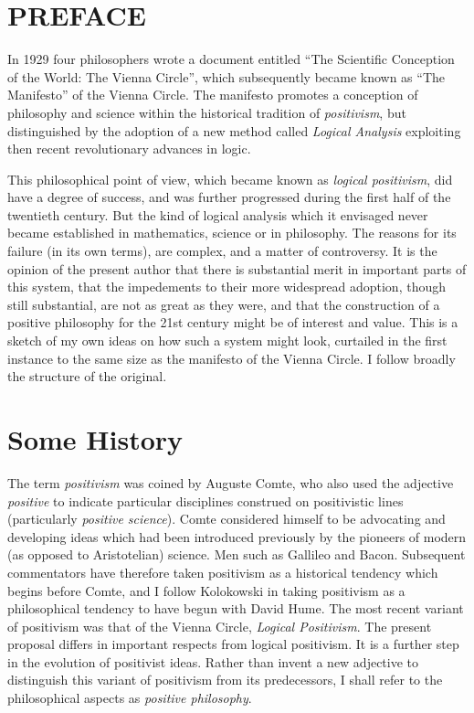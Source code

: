\section*{PREFACE}

In 1929 four philosophers wrote a document entitled ``The Scientific Conception of the World: The Vienna Circle'', which subsequently became known as ``The Manifesto'' of the Vienna Circle.
The manifesto promotes a conception of philosophy and science within the historical tradition of \emph{positivism}, but distinguished by the adoption of a new method called \emph{Logical Analysis} exploiting then recent revolutionary advances in logic.

This philosophical point of view, which became known as \emph{logical positivism}, did have a degree of success, and was further progressed during the first half of the twentieth century.
But the kind of logical analysis which it envisaged never became established in mathematics, science or in philosophy.
The reasons for its failure (in its own terms), are complex, and a matter of controversy.
It is the opinion of the present author that there is substantial merit in important parts of this system, that the impedements to their more widespread adoption, though still substantial, are not as great as they were, and that the construction of a positive philosophy for the 21st century might be of interest and value.
This is a sketch of my own ideas on how such a system might look, curtailed in the first instance to the same size as the manifesto of the Vienna Circle.
I follow broadly the structure of the original.

\section{Some History}

The term \emph{positivism} was coined by Auguste Comte, who also used the adjective \emph{positive} to indicate particular disciplines construed on positivistic lines (particularly \emph{positive science}).
Comte considered himself to be advocating and developing ideas which had been introduced previously by the pioneers of modern (as opposed to Aristotelian) science.
Men such as Gallileo and Bacon.
Subsequent commentators have therefore taken positivism as a historical tendency which begins before Comte, and I follow Kolokowski in taking positivism as a philosophical tendency to have begun with David Hume.
The most recent variant of positivism was that of the Vienna Circle, \emph{Logical Positivism}.
The present proposal differs in important respects from logical positivism.
It is a further step in the evolution of positivist ideas.
Rather than invent a new adjective to distinguish this variant of positivism from its predecessors, I shall refer to the philosophical aspects as \emph{positive philosophy}.

